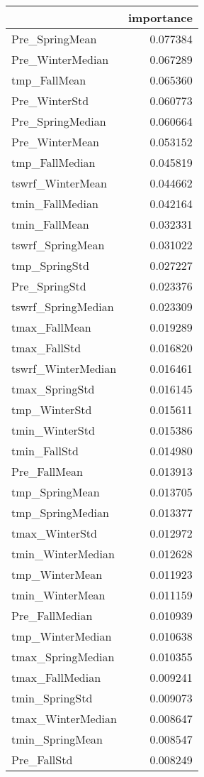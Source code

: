 \begin{tabular}{lr}
\toprule
 & importance \\
\midrule
Pre_SpringMean & 0.077384 \\
Pre_WinterMedian & 0.067289 \\
tmp_FallMean & 0.065360 \\
Pre_WinterStd & 0.060773 \\
Pre_SpringMedian & 0.060664 \\
Pre_WinterMean & 0.053152 \\
tmp_FallMedian & 0.045819 \\
tswrf_WinterMean & 0.044662 \\
tmin_FallMedian & 0.042164 \\
tmin_FallMean & 0.032331 \\
tswrf_SpringMean & 0.031022 \\
tmp_SpringStd & 0.027227 \\
Pre_SpringStd & 0.023376 \\
tswrf_SpringMedian & 0.023309 \\
tmax_FallMean & 0.019289 \\
tmax_FallStd & 0.016820 \\
tswrf_WinterMedian & 0.016461 \\
tmax_SpringStd & 0.016145 \\
tmp_WinterStd & 0.015611 \\
tmin_WinterStd & 0.015386 \\
tmin_FallStd & 0.014980 \\
Pre_FallMean & 0.013913 \\
tmp_SpringMean & 0.013705 \\
tmp_SpringMedian & 0.013377 \\
tmax_WinterStd & 0.012972 \\
tmin_WinterMedian & 0.012628 \\
tmp_WinterMean & 0.011923 \\
tmin_WinterMean & 0.011159 \\
Pre_FallMedian & 0.010939 \\
tmp_WinterMedian & 0.010638 \\
tmax_SpringMedian & 0.010355 \\
tmax_FallMedian & 0.009241 \\
tmin_SpringStd & 0.009073 \\
tmax_WinterMedian & 0.008647 \\
tmin_SpringMean & 0.008547 \\
Pre_FallStd & 0.008249 \\

\end{tabular}
